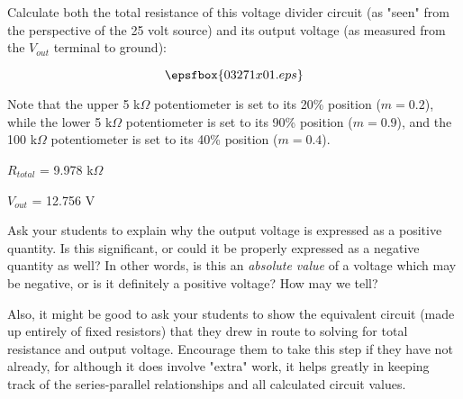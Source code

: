 

Calculate both the total resistance of this voltage divider circuit (as "seen" from the perspective of the 25 volt source) and its output voltage (as measured from the $V_{out}$ terminal to ground): 

$$\epsfbox{03271x01.eps}$$

Note that the upper 5 k$\Omega$ potentiometer is set to its 20\% position ($m = 0.2$), while the lower 5 k$\Omega$ potentiometer is set to its 90\% position ($m = 0.9$), and the 100 k$\Omega$ potentiometer is set to its 40\% position ($m = 0.4$).







$R_{total}$ = 9.978 k$\Omega$

\vskip 10pt

$V_{out}$ = 12.756 V







Ask your students to explain why the output voltage is expressed as a positive quantity.  Is this significant, or could it be properly expressed as a negative quantity as well?  In other words, is this an {\it absolute value} of a voltage which may be negative, or is it definitely a positive voltage?  How may we tell?

Also, it might be good to ask your students to show the equivalent circuit (made up entirely of fixed resistors) that they drew in route to solving for total resistance and output voltage.  Encourage them to take this step if they have not already, for although it does involve "extra" work, it helps greatly in keeping track of the series-parallel relationships and all calculated circuit values.




